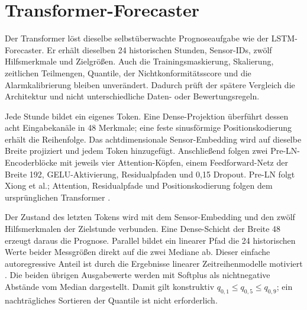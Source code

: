 \section[Transformer]{Transformer-Forecaster}
\label{sec:Methode_Transformer}

Der Transformer löst dieselbe selbstüberwachte Prognoseaufgabe wie der
LSTM-Forecaster. Er erhält dieselben 24 historischen Stunden, Sensor-IDs,
zwölf Hilfsmerkmale und Zielgrößen. Auch die Trainingsmaskierung, Skalierung,
zeitlichen Teilmengen, Quantile, der Nichtkonformitätsscore und die
Alarmkalibrierung bleiben unverändert. Dadurch prüft der spätere Vergleich die
Architektur und nicht unterschiedliche Daten- oder Bewertungsregeln.

Jede Stunde bildet ein eigenes Token. Eine Dense-Projektion überführt dessen
acht Eingabekanäle in 48 Merkmale; eine feste sinusförmige
Positionskodierung erhält die Reihenfolge. Das achtdimensionale
Sensor-Embedding wird auf dieselbe Breite projiziert und jedem Token
hinzugefügt. Anschließend folgen zwei Pre-LN-Encoderblöcke mit jeweils vier
Attention-Köpfen, einem Feedforward-Netz der Breite 192, GELU-Aktivierung,
Residualpfaden und 0{,}15 Dropout. Pre-LN folgt Xiong et al.; Attention,
Residualpfade und Positionskodierung folgen dem ursprünglichen Transformer
\cite{xiong2020layernorm,vaswani2017attention}.

Der Zustand des letzten Tokens wird mit dem Sensor-Embedding und den zwölf
Hilfsmerkmalen der Zielstunde verbunden. Eine Dense-Schicht der
Breite 48 erzeugt daraus die Prognose. Parallel bildet ein linearer Pfad die 24
historischen Werte beider Messgrößen direkt auf die zwei Mediane ab. Dieser
einfache autoregressive Anteil ist durch die Ergebnisse linearer
Zeitreihenmodelle motiviert \cite{zeng2023transformers}. Die beiden übrigen
Ausgabewerte werden mit Softplus als nichtnegative Abstände vom Median
dargestellt. Damit gilt konstruktiv
$q_{0{,}1}\leq q_{0{,}5}\leq q_{0{,}9}$; ein nachträgliches Sortieren der
Quantile ist nicht erforderlich.

